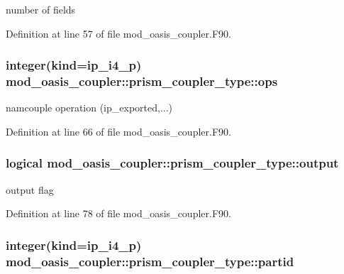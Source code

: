 number of fields 



Definition at line 57 of file mod\+\_\+oasis\+\_\+coupler.\+F90.

\hypertarget{structmod__oasis__coupler_1_1prism__coupler__type_ac041ba5de191fa34468f61a674dd5bac}{
\subsubsection[{ops}]{\setlength{\rightskip}{0pt plus 5cm}integer(kind=ip\+\_\+i4\+\_\+p) mod\+\_\+oasis\+\_\+coupler\+::prism\+\_\+coupler\+\_\+type\+::ops\hspace{0.3cm}{\ttfamily [private]}}}\label{structmod__oasis__coupler_1_1prism__coupler__type_ac041ba5de191fa34468f61a674dd5bac}


namcouple operation (ip\+\_\+exported,...) 



Definition at line 66 of file mod\+\_\+oasis\+\_\+coupler.\+F90.

\hypertarget{structmod__oasis__coupler_1_1prism__coupler__type_a56fc19e4619dd8224859f222566ea7ca}{
\subsubsection[{output}]{\setlength{\rightskip}{0pt plus 5cm}logical mod\+\_\+oasis\+\_\+coupler\+::prism\+\_\+coupler\+\_\+type\+::output\hspace{0.3cm}{\ttfamily [private]}}}\label{structmod__oasis__coupler_1_1prism__coupler__type_a56fc19e4619dd8224859f222566ea7ca}


output flag 



Definition at line 78 of file mod\+\_\+oasis\+\_\+coupler.\+F90.

\hypertarget{structmod__oasis__coupler_1_1prism__coupler__type_a5506dc46a0c8def7417a6e2a9c046474}{
\subsubsection[{partid}]{\setlength{\rightskip}{0pt plus 5cm}integer(kind=ip\+\_\+i4\+\_\+p) mod\+\_\+oasis\+\_\+coupler\+::prism\+\_\+coupler\+\_\+type\+::partid\hspace{0.3cm}{\ttfamily [private]}}}\label{structmod__oasis__coupler_1_1prism__coupler__type_a5506dc46a0c8def7417a6e2a9c046474}


